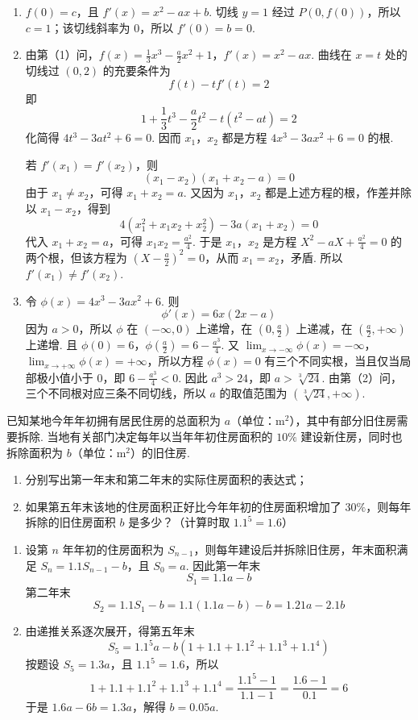 \begin{solution}
\begin{enumerate}
\item \(f(0)=c\)，且 \(f'(x)=x^2-ax+b\). 切线 \(y=1\) 经过 \(P(0,f(0))\)，所以 \(c=1\)；该切线斜率为 \(0\)，所以 \(f'(0)=b=0\).
\item 由第（1）问，\(f(x)=\frac13x^3-\frac a2x^2+1\)，\(f'(x)=x^2-ax\). 曲线在 \(x=t\) 处的切线过 \((0,2)\) 的充要条件为
\[
f(t)-tf'(t)=2
\]
即
\[
1+\frac13t^3-\frac a2t^2-t(t^2-at)=2
\]
化简得 \(4t^3-3at^2+6=0\). 因而 \(x_1\)，\(x_2\) 都是方程 \(4x^3-3ax^2+6=0\) 的根.

若 \(f'(x_1)=f'(x_2)\)，则
\[
(x_1-x_2)(x_1+x_2-a)=0
\]
由于 \(x_1\neq x_2\)，可得 \(x_1+x_2=a\). 又因为 \(x_1\)，\(x_2\) 都是上述方程的根，作差并除以 \(x_1-x_2\)，得到
\[
4(x_1^2+x_1x_2+x_2^2)-3a(x_1+x_2)=0
\]
代入 \(x_1+x_2=a\)，可得 \(x_1x_2=\frac{a^2}{4}\). 于是 \(x_1\)，\(x_2\) 是方程 \(X^2-aX+\frac{a^2}{4}=0\) 的两个根，但该方程为 \(\left(X-\frac a2\right)^2=0\)，从而 \(x_1=x_2\)，矛盾. 所以 \(f'(x_1)\neq f'(x_2)\).
\item 令 \(\phi(x)=4x^3-3ax^2+6\). 则
\[
\phi'(x)=6x(2x-a)
\]
因为 \(a>0\)，所以 \(\phi\) 在 \((-\infty,0)\) 上递增，在 \((0,\frac{a}{2})\) 上递减，在 \((\frac{a}{2},+\infty)\) 上递增. 且
\(\phi(0)=6\)，\(\phi\left(\frac a2\right)=6-\frac{a^3}{4}\).
又 \(\lim_{x\to-\infty}\phi(x)=-\infty\)，\(\lim_{x\to+\infty}\phi(x)=+\infty\)，所以方程 \(\phi(x)=0\) 有三个不同实根，当且仅当局部极小值小于 \(0\)，即 \(6-\frac{a^3}{4}<0\). 因此 \(a^3>24\)，即 \(a>\sqrt[3]{24}\). 由第（2）问，三个不同根对应三条不同切线，所以 \(a\) 的取值范围为 \((\sqrt[3]{24},+\infty)\).
\end{enumerate}
\end{solution}

\begin{problem}
已知某地今年年初拥有居民住房的总面积为 \(a\)（单位：\(\mathrm{m}^2\)），其中有部分旧住房需要拆除. 当地有关部门决定每年以当年年初住房面积的 \(10\%\) 建设新住房，同时也拆除面积为 \(b\)（单位：\(\mathrm{m}^2\)）的旧住房.
\begin{enumerate}
\item 分别写出第一年末和第二年末的实际住房面积的表达式；
\item 如果第五年末该地的住房面积正好比今年年初的住房面积增加了 \(30\%\)，则每年拆除的旧住房面积 \(b\) 是多少？（计算时取 \(1.1^{5}=1.6\)）
\end{enumerate}
\end{problem}

\begin{solution}
\begin{enumerate}
\item 设第 \(n\) 年年初的住房面积为 \(S_{n-1}\)，则每年建设后并拆除旧住房，年末面积满足 \(S_n=1.1S_{n-1}-b\)，且 \(S_0=a\). 因此第一年末
\[
S_1=1.1a-b
\]
第二年末
\[
S_2=1.1S_1-b=1.1(1.1a-b)-b=1.21a-2.1b
\]
\item 由递推关系逐次展开，得第五年末
\[
S_5=1.1^5a-b(1+1.1+1.1^2+1.1^3+1.1^4)
\]
按题设 \(S_5=1.3a\)，且 \(1.1^5=1.6\)，所以
\[
1+1.1+1.1^2+1.1^3+1.1^4=\frac{1.1^5-1}{1.1-1}=\frac{1.6-1}{0.1}=6
\]
于是 \(1.6a-6b=1.3a\)，解得 \(b=0.05a\).
\end{enumerate}
\end{solution}
